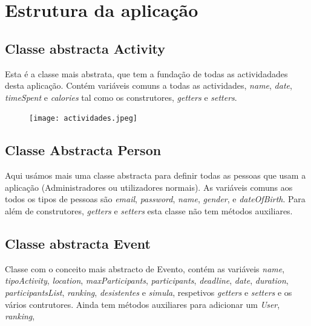 \documentclass[10pt,notitlepage]{article}
\begin{document}
\newpage

\tableofcontents

\newpage


\section{Estrutura da aplicação}

\subsection{Classe abstracta Activity}

Esta é a classe mais abstrata, que tem a fundação de todas as actividadades desta aplicação. Contém variáveis comuns a todas as actividades, \textit{name}, \textit{date}, \textit{timeSpent} e \textit{calories} tal como os construtores, \textit{getters} e  \textit{setters}.

\begin{figure}[h]
\centering
\texttt{[image: actividades.jpeg]}
\end{figure}


\subsection{Classe Abstracta Person}

Aqui usámos mais uma classe abstracta para definir todas as pessoas que usam a aplicação (Administradores ou utilizadores normais). As variáveis comuns aos todos os tipos de pessoas são \textit{email}, \textit{password}, \textit{name}, \textit{gender}, e \textit{dateOfBirth}. Para além de 
construtores, \textit{getters} e \textit{setters} esta classe não tem métodos auxiliares.





\subsection{Classe abstracta Event}

Classe com o conceito mais abstracto de Evento, contém as variáveis \textit{name}, \textit{tipoActivity}, \textit{location}, \textit{maxParticipants}, \textit{participants}, \textit{deadline}, \textit{date}, \textit{duration}, \textit{participantsList}, \textit{ranking}, \textit{desistentes} e \textit{simula}, respetivos \textit{getters} e \textit{setters} e os vários contrutores. Ainda tem métodos auxiliares para adicionar um \textit{User}, \textit{ranking}, 
\end{document}
